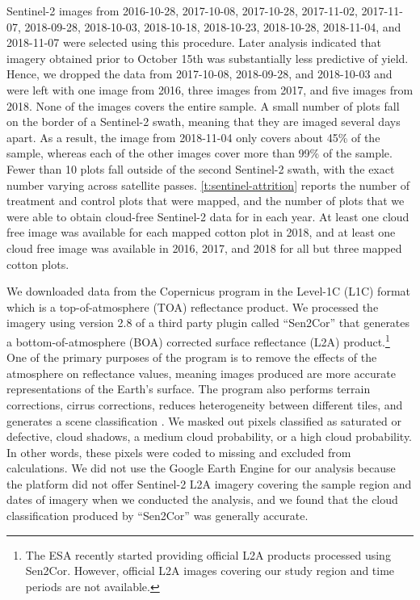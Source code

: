 \documentclass{article}
\begin{document}
Sentinel-2 images from 2016-10-28, 2017-10-08, 2017-10-28, 2017-11-02, 2017-11-07, 2018-09-28, 2018-10-03, 2018-10-18, 2018-10-23, 2018-10-28, 2018-11-04, and 2018-11-07 were selected using this procedure. Later analysis indicated that imagery obtained prior to October 15th was substantially less predictive of yield. Hence, we dropped the data from 2017-10-08, 2018-09-28, and 2018-10-03 and were left with one image from 2016, three images from 2017, and five images from 2018. None of the images covers the entire sample. A small number of plots fall on the border of a Sentinel-2 swath, meaning that they are imaged several days apart. As a result, the image from 2018-11-04 only covers about 45\% of the sample, whereas each of the other images cover more than 99\% of the sample. Fewer than 10 plots fall outside of the second Sentinel-2 swath, with the exact number varying across satellite passes. \ref{t:sentinel-attrition} reports the number of treatment and control plots that were mapped, and the number of plots that we were able to obtain cloud-free Sentinel-2 data for in each year. At least one cloud free image was available for each mapped cotton plot in 2018, and at least one cloud free image was available in 2016, 2017, and 2018 for all but three mapped cotton plots. 

We downloaded data from the Copernicus program in the Level-1C (L1C) format which is a top-of-atmosphere (TOA) reflectance product. We processed the imagery using version 2.8 of a third party plugin called ``Sen2Cor'' that generates a bottom-of-atmosphere (BOA) corrected surface reflectance (L2A) product.\footnote{The ESA recently started providing official L2A products processed using Sen2Cor. However, official L2A images covering our study region and time periods are not available.} One of the primary purposes of the program is to remove the effects of the atmosphere on reflectance values, meaning images produced are more accurate representations of the Earth’s surface. The program also performs terrain corrections, cirrus corrections, reduces heterogeneity between different tiles, and generates a scene classification \citep{Mueller-Wilm2019Sen2CorManual}. We masked out pixels classified as saturated or defective, cloud shadows, a medium cloud probability, or a high cloud probability. In other words, these pixels were coded to missing and excluded from calculations. We did not use the Google Earth Engine for our analysis because the platform did not offer Sentinel-2 L2A imagery covering the sample region and dates of imagery when we conducted the analysis, and we found that the cloud classification produced by ``Sen2Cor'' was generally accurate. 
\end{document}
